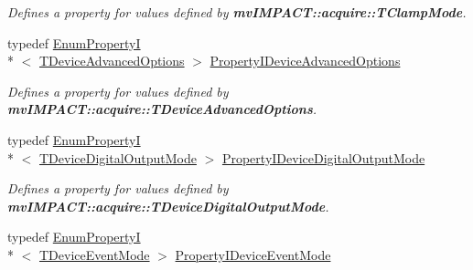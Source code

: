 \begin{DoxyCompactItemize}
\begin{DoxyCompactList}\small\item\em Defines a property for values defined by {\bfseries mv\+I\+M\+P\+A\+C\+T\+::acquire\+::\+T\+Clamp\+Mode}. \end{DoxyCompactList}\item 
\hypertarget{group___device_specific_interface_ga100e69ae1a36b64b3abed0337f42628a}{typedef \hyperlink{classmv_i_m_p_a_c_t_1_1acquire_1_1_enum_property_i}{Enum\+Property\+I}\\*
$<$ \hyperlink{group___device_specific_interface_gad8cdd91ea42682e1055b0fb168f2ea58}{T\+Device\+Advanced\+Options} $>$ \hyperlink{group___device_specific_interface_ga100e69ae1a36b64b3abed0337f42628a}{Property\+I\+Device\+Advanced\+Options}}\label{group___device_specific_interface_ga100e69ae1a36b64b3abed0337f42628a}

\begin{DoxyCompactList}\small\item\em Defines a property for values defined by {\bfseries mv\+I\+M\+P\+A\+C\+T\+::acquire\+::\+T\+Device\+Advanced\+Options}. \end{DoxyCompactList}\item 
\hypertarget{group___device_specific_interface_ga5f000e26caff489ab90bc45f1adb64ea}{typedef \hyperlink{classmv_i_m_p_a_c_t_1_1acquire_1_1_enum_property_i}{Enum\+Property\+I}\\*
$<$ \hyperlink{group___device_specific_interface_gad65061e17a93ca4a79e5b75d8ca78a27}{T\+Device\+Digital\+Output\+Mode} $>$ \hyperlink{group___device_specific_interface_ga5f000e26caff489ab90bc45f1adb64ea}{Property\+I\+Device\+Digital\+Output\+Mode}}\label{group___device_specific_interface_ga5f000e26caff489ab90bc45f1adb64ea}

\begin{DoxyCompactList}\small\item\em Defines a property for values defined by {\bfseries mv\+I\+M\+P\+A\+C\+T\+::acquire\+::\+T\+Device\+Digital\+Output\+Mode}. \end{DoxyCompactList}\item 
\hypertarget{group___device_specific_interface_ga703f3c4af8606165b832097144354c75}{typedef \hyperlink{classmv_i_m_p_a_c_t_1_1acquire_1_1_enum_property_i}{Enum\+Property\+I}\\*
$<$ \hyperlink{group___common_interface_gaaf184a07cd31343a6b831f41ee7038b4}{T\+Device\+Event\+Mode} $>$ \hyperlink{group___device_specific_interface_ga703f3c4af8606165b832097144354c75}{Property\+I\+Device\+Event\+Mode}}\label{group___device_specific_interface_ga703f3c4af8606165b832097144354c75}


\end{DoxyCompactItemize}
